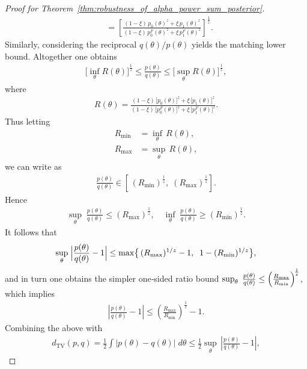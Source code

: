 \documentclass[12pt]{article}
\begin{document}
\begin{proof}[Proof for Theorem~\ref{thm:robustness_of_alpha_power_sum_posterior}]
\begin{align*}
    &=  \left[\frac{(1-\xi)\,p_0(\theta)^z + \xi\,p_1(\theta)^z}{(1-\xi)\,p_0^F(\theta)^z + \xi\,p_1^F(\theta)^z}\right]^{\frac1z}.
    \end{align*}
    Similarly, considering the reciprocal $q(\theta)/p(\theta)$ yields the matching lower bound.
    Altogether one obtains
    \begin{align*}
        \bigl[\inf_\theta R(\theta)\bigr]^{\frac1z} \leq  \frac{p(\theta)}{q(\theta)} \leq \bigl[\sup_\theta R(\theta)\bigr]^{\frac1z},
    \end{align*}
    where
    \begin{align*}
        R(\theta) = \frac{(1-\xi)\,\bigl[p_0(\theta)\bigr]^z + \xi\,\bigl[p_1(\theta)\bigr]^z}{(1-\xi)\,\bigl[p_0^F(\theta)\bigr]^z + \xi\,\bigl[p_1^F(\theta)\bigr]^z}.
    \end{align*}
    Thus letting
    \begin{align*}
        R_{\min} &= \inf_\theta\,R(\theta), \\
        R_{\max} &= \sup_\theta\,R(\theta),
    \end{align*}
    we can write as
    \begin{align*}
        \frac{p(\theta)}{q(\theta)} \in  \left[\, (R_{\min})^{\frac{1}{z}},\;(R_{\max})^{\frac{1}{z}}\right].
    \end{align*}
    Hence
    \begin{align*}
        \sup_\theta\;\frac{p(\theta)}{q(\theta)} \leq (R_{\max})^{\frac1z}, \quad \inf_\theta\;\frac{p(\theta)}{q(\theta)} \geq (R_{\min})^{\frac1z}.
    \end{align*}
    It follows that
    \begin{align*}
        \sup_{\theta}\;\Bigl|\frac{p(\theta)}{q(\theta)}-1\Bigr| \leq  \max\bigl\{\, (R_{\max})^{1/z} -1,\;\; 1 - (R_{\min})^{1/z} \bigr\},
    \end{align*}
    and in turn one obtains the simpler one‐sided ratio bound $\sup_{\theta}\;\frac{p(\theta)}{q(\theta)} \leq  \Bigl(\frac{R_{\max}}{R_{\min}}\Bigr)^{\!\frac1z}$, which implies 
    \begin{align*}
        \left|\frac{p(\theta)}{q(\theta)}-1\right| \leq \left(\frac{R_{\max}}{R_{\min}}\right)^{\!\frac1z} -1.
    \end{align*}
    Combining the above with
    \begin{align*}
        d_{\mathrm{TV}}(p,q) = \frac{1}{2} \int\bigl|p(\theta)-q(\theta)\bigr|\;d\theta \leq \frac12\sup_{\theta}\,\left|\frac{p(\theta)}{q(\theta)}-1\right|,
    \end{align*}

\end{proof}
\end{document}
